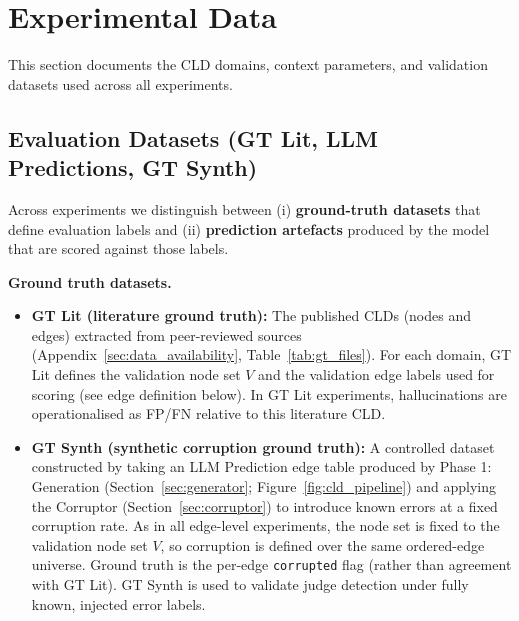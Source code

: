\chapter{Experimental Data}
\label{sec:experimental_data}

This section documents the CLD domains, context parameters, and validation datasets used across all experiments.

\section{Evaluation Datasets (GT Lit, LLM Predictions, GT Synth)}
\label{sec:evaluation_datasets}

Across experiments we distinguish between (i) \textbf{ground-truth datasets} that define evaluation labels and (ii) \textbf{prediction artefacts} produced by the model that are scored against those labels.

\noindent\textbf{Ground truth datasets.}
\begin{itemize}[noitemsep]
    \item \textbf{GT Lit (literature ground truth):} The published CLDs (nodes and edges) extracted from peer-reviewed sources (Appendix~\ref{sec:data_availability}, Table~\ref{tab:gt_files}). For each domain, GT Lit defines the validation node set \(V\) and the validation edge labels used for scoring (see edge definition below). In GT Lit experiments, hallucinations are operationalised as FP/FN relative to this literature CLD.
    \item \textbf{GT Synth (synthetic corruption ground truth):} A controlled dataset constructed by taking an LLM Prediction edge table produced by Phase 1: Generation (Section~\ref{sec:generator}; Figure~\ref{fig:cld_pipeline}) and applying the Corruptor (Section~\ref{sec:corruptor}) to introduce known errors at a fixed corruption rate. As in all edge-level experiments, the node set is fixed to the validation node set \(V\), so corruption is defined over the same ordered-edge universe. Ground truth is the per-edge \texttt{corrupted} flag (rather than agreement with GT Lit). GT Synth is used to validate judge detection under fully known, injected error labels.
\end{itemize}

